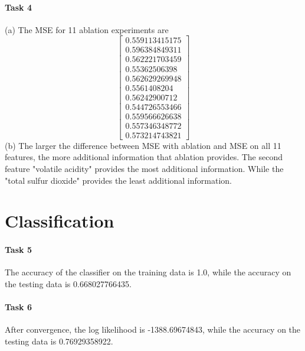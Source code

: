 \documentclass[a4paper,11pt]{article}
\theoremstyle{mytheor}
\begin{document}
\paragraph{Task 4}
(a) The MSE for 11 ablation experiments are 
$$
\begin{bmatrix}
0.559113415175\\
0.596384849311\\
0.562221703459\\
0.55362506398\\
0.562629269948\\
0.5561408204\\
0.56242900712\\
0.544726553466\\
0.559566626638\\
0.557346348772\\
0.573214743821
\end{bmatrix}
$$
(b) The larger the difference between MSE with ablation and MSE on all 11 features, the more additional information that ablation provides. The second feature "volatile acidity" provides the most additional information. While the "total sulfur dioxide" provides the least additional information.
\clearpage

\section{Classification}

\paragraph{Task 5}
The accuracy of the classifier on the training data is 1.0, while the accuracy on the testing data is 0.668027766435.

\paragraph{Task 6}
After convergence, the log likelihood is -1388.69674843, while the accuracy on the testing data is 0.76929358922.
\end{document}
